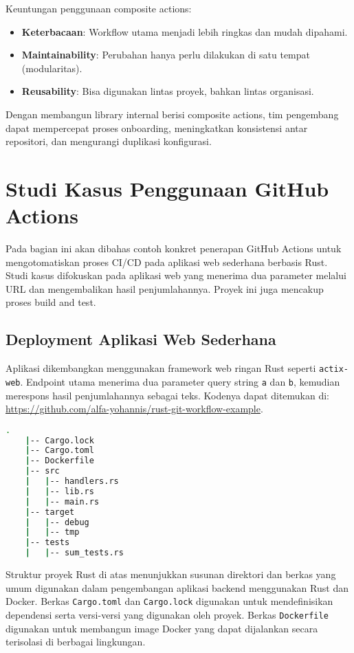 Keuntungan penggunaan composite actions:

\begin{itemize}
	\item \textbf{Keterbacaan}: Workflow utama menjadi lebih ringkas dan mudah dipahami.
	\item \textbf{Maintainability}: Perubahan hanya perlu dilakukan di satu tempat (modularitas).
	\item \textbf{Reusability}: Bisa digunakan lintas proyek, bahkan lintas organisasi.
\end{itemize}

Dengan membangun library internal berisi composite actions, tim pengembang dapat mempercepat proses onboarding, meningkatkan konsistensi antar repositori, dan mengurangi duplikasi konfigurasi.


\section{Studi Kasus Penggunaan GitHub Actions}

Pada bagian ini akan dibahas contoh konkret penerapan GitHub Actions untuk mengotomatiskan proses CI/CD pada aplikasi web sederhana berbasis Rust. Studi kasus difokuskan pada aplikasi web yang menerima dua parameter melalui URL dan mengembalikan hasil penjumlahannya. Proyek ini juga mencakup proses build and test.

\subsection{Deployment Aplikasi Web Sederhana}

Aplikasi dikembangkan menggunakan framework web ringan Rust seperti \texttt{actix-web}. Endpoint utama menerima dua parameter query string \texttt{a} dan \texttt{b}, kemudian merespons hasil penjumlahannya sebagai teks. Kodenya dapat ditemukan di: \url{https://github.com/alfa-yohannis/rust-git-workflow-example}.


\begin{lstlisting}[language=bash, caption={Struktur Proyek Rust}]
	.
	|-- Cargo.lock
	|-- Cargo.toml
	|-- Dockerfile
	|-- src
	|   |-- handlers.rs
	|   |-- lib.rs
	|   |-- main.rs
	|-- target
	|   |-- debug
	|   |-- tmp
	|-- tests
	|   |-- sum_tests.rs
\end{lstlisting}

Struktur proyek Rust di atas menunjukkan susunan direktori dan berkas yang umum digunakan dalam pengembangan aplikasi backend menggunakan Rust dan Docker. Berkas \texttt{Cargo.toml} dan \texttt{Cargo.lock} digunakan untuk mendefinisikan dependensi serta versi-versi yang digunakan oleh proyek. Berkas \texttt{Dockerfile} digunakan untuk membangun image Docker yang dapat dijalankan secara terisolasi di berbagai lingkungan.

